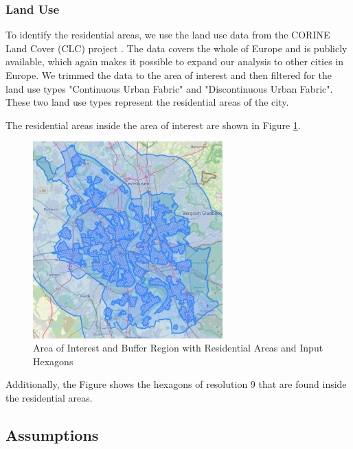 \subsubsection{Land Use}
\label{subs:land_use}

To identify the residential areas, we use the land use data from the CORINE Land Cover (CLC) project .
The data covers the whole of Europe and is publicly available, which again makes it possible to expand our analysis to other cities in Europe.
We trimmed the data to the area of interest and then filtered for the land use types "Continuous Urban Fabric" and "Discontinuous Urban Fabric".
These two land use types represent the residential areas of the city.

The residential areas inside the area of interest are shown in Figure \ref{fig:input_hexagons_residential_areas}.

\begin{figure}
  \begin{center}
    \includegraphics[width=0.65\textwidth]{Figures/experiment/input_hexagons_residential_areas.png}
  \end{center}
  \caption{Area of Interest and Buffer Region with Residential Areas and Input Hexagons}
  \label{fig:input_hexagons_residential_areas}
\end{figure}

Additionally, the Figure shows the hexagons of resolution 9 that are found inside the residential areas.


\subsection{Assumptions}
\label{subs:assumptions}

